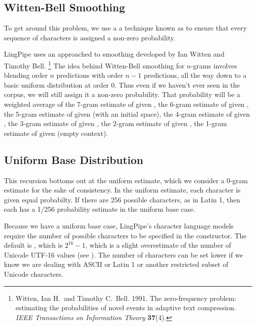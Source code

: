 \subsection{Witten-Bell Smoothing}

To get around this problem, we use a a technique known as
 to ensure that every sequence of
characters is assigned a non-zero probability.  

LingPipe uses an approached to smoothing developed by Ian Witten and Timothy Bell.%
%
\footnote{Witten, Ian H.\ and Timothy C.~Bell. 1991. The zero-frequency
  problem: estimating the probabilities of novel events in adaptive
  text compression. {\it IEEE Transactions on Information Theory} {\bf 37}(4).}
%
The idea behind Witten-Bell smoothing for $n$-grams involves blending
order $n$ predictions with order $n-1$ predictions, all the way down
to a basic uniform distribution at order 0.  Thus even if we haven't
ever seen  in the corpus, we will still assign
it a non-zero probability.  That probability will be a weighted
average of the 7-gram estimate of  given
, the 6-gram estimate of  given
, the 5-gram estimate of  given
 (with an initial space), the 4-gram estimate of
 given , the 3-gram estimate of
 given , the 2-gram estimate of
 given , the 1-gram estimate of
 given \stringmention{} (empty context).  

\subsection{Uniform Base Distribution}

This recursion bottoms out at the uniform estimate, which we consider
a 0-gram estimate for the sake of consistency.  In the uniform
estimate, each character is given equal probabilty.  If there are 256
possible characters, as in Latin 1, then each has a 1/256 probability
estimate in the uniform base case.  

Because we have a uniform base case, LingPipe's character language
models require the number of possible characters to be specified in
the constructor.  The default is , which is
$2^{16}-1$, which is a slight overestimate of the number of Unicode
UTF-16 values (see ).  The number of characters
can be set lower if we know we are dealing with ASCII or Latin 1 or
another restricted subset of Unicode characters.

